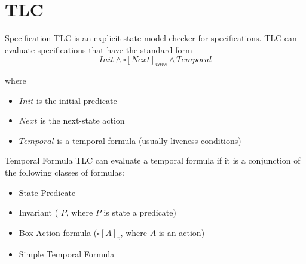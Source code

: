
\section[image=gae_aulenti]{TLC}
\begin{frame}[plain]{}
    \sectionpage
\end{frame}

\begin{frame}{Specification}
    TLC is an explicit-state model checker for \tlap specifications.
    TLC can evaluate specifications that have the standard form
    \[
        Init \land \square \left[ Next \right]_{vars} \land Temporal
    \]

    where
    \begin{itemize}
        \item $Init$ is the initial predicate
        \item $Next$ is the next-state action
        \item $Temporal$ is a temporal formula (usually liveness conditions)
    \end{itemize}

\end{frame}

\begin{frame}{Temporal Formula}
    TLC can evaluate a temporal formula if it is a conjunction of the following classes of formulas:
    \begin{itemize}
        \item State Predicate
        \item Invariant ($\square P$, where $P$ is state a predicate)
        \item Box-Action formula ($\square[A]_v$, where $A$ is an action)
        \item Simple Temporal Formula
    \end{itemize}
\end{frame}

